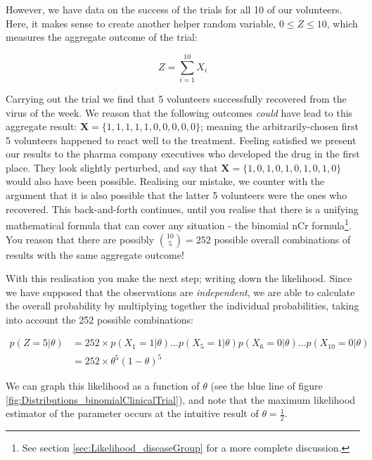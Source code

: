 \documentclass[11pt,fullpage]{book}
\begin{document}
However, we have data on the success of the trials for all 10 of our volunteers. Here, it makes sense to create another helper random variable, $0\leq Z\leq 10$, which measures the aggregate outcome of the trial:

\begin{equation}
Z = \sum\limits_{i=1}^{10} X_i
\end{equation}

Carrying out the trial we find that 5 volunteers successfully recovered from the virus of the week. We reason that the following outcomes \textit{could} have lead to this aggregate result: $\boldsymbol{X} = \{1,1,1,1,1,0,0,0,0,0\}$; meaning the arbitrarily-chosen first 5 volunteers happened to react well to the treatment. Feeling satisfied we present our results to the pharma company executives who developed the drug in the first place. They look slightly perturbed, and say that $\boldsymbol{X} = \{1,0,1,0,1,0,1,0,1,0\}$ would also have been possible. Realising our mistake, we counter with the argument that it is also possible that the latter 5 volunteers were the ones who recovered. This back-and-forth continues, until you realise that there is a unifying mathematical formula that can cover any situation - the binomial nCr formula\footnote{See section \ref{sec:Likelihood_diseaseGroup} for a more complete discussion.}. You reason that there are possibly ${10 \choose 5}=252$  possible overall combinations of results with the same aggregate outcome!

With this realisation you make the next step; writing down the likelihood. Since we have supposed that the observations are \textit{independent}, we are able to calculate the overall probability by multiplying together the individual probabilities, taking into account the 252 possible combinations:

\begin{equation}
\begin{align}
p(Z=5|\theta) &= 252\times p(X_1=1|\theta) ... p(X_5=1|\theta) p(X_6=0|\theta) ... p(X_10=0|\theta)\\
&= 252\times \theta^5 (1-\theta)^5
\end{align}
\end{equation}

We can graph this likelihood as a function of $\theta$ (see the blue line of figure \ref{fig:Distributions_binomialClinicalTrial}), and note that the maximum likelihood estimator of the parameter occurs at the intuitive result of $\theta=\frac{1}{2}$.
\end{document}
